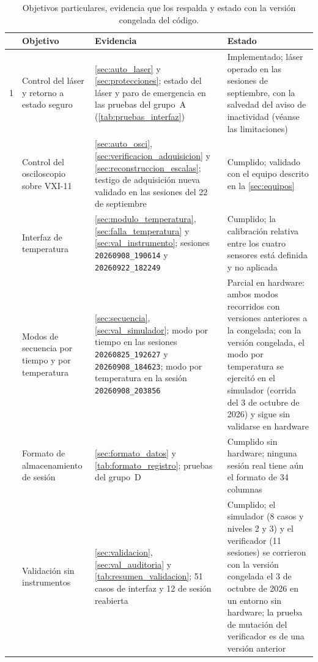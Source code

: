 \begin{table}[H]
  \centering
  \caption{Objetivos particulares, evidencia que los respalda y estado
           con la versión congelada del código.}
  \label{tab:objetivos_evidencia}
  \footnotesize
  \begin{tabular}{p{0.5cm}>{\raggedright\arraybackslash}p{3.3cm}>{\raggedright\arraybackslash}p{4.8cm}>{\raggedright\arraybackslash}p{4.6cm}}
    \toprule
    & \textbf{Objetivo} & \textbf{Evidencia} & \textbf{Estado} \\
    \midrule
    1 & Control del láser y retorno a estado seguro &
    \cref{sec:auto_laser} y \cref{sec:protecciones}; estado del
    láser y paro de emergencia en las pruebas del grupo~A
    (\cref{tab:pruebas_interfaz}) &
    Implementado; láser operado en las sesiones de septiembre, con la
    salvedad del aviso de inactividad (véanse las limitaciones) \\
    \addlinespace[2pt]
    2 & Control del osciloscopio sobre VXI-11 &
    \cref{sec:auto_osci}, \cref{sec:verificacion_adquisicion} y
    \cref{sec:reconstruccion_escalas}; testigo de adquisición nueva
    validado en las sesiones del 22 de septiembre &
    Cumplido; validado con el equipo descrito en la
    \cref{sec:equipos} \\
    \addlinespace[2pt]
    3 & Interfaz de temperatura &
    \cref{sec:modulo_temperatura}, \cref{sec:falla_temperatura} y
    \cref{sec:val_instrumento}; sesiones \texttt{20260908\_190614} y
    \texttt{20260922\_182249} &
    Cumplido; la calibración relativa entre los cuatro sensores
    está definida y no aplicada \\
    \addlinespace[2pt]
    4 & Modos de secuencia por tiempo y por temperatura &
    \cref{sec:secuencia}, \cref{sec:val_simulador}; modo por tiempo en
    las sesiones \texttt{20260825\_192627} y
    \texttt{20260908\_184623}; modo por temperatura en la sesión
    \texttt{20260908\_203856} &
    Parcial en hardware: ambos modos recorridos con versiones
    anteriores a la congelada; con la versión congelada, el modo por
    temperatura se ejercitó en el simulador (corrida del 3 de octubre de
    2026) y sigue sin validarse en hardware \\
    \addlinespace[2pt]
    5 & Formato de almacenamiento de sesión &
    \cref{sec:formato_datos} y \cref{tab:formato_registro};
    pruebas del grupo~D &
    Cumplido sin hardware; ninguna sesión real tiene aún el formato
    de 34 columnas \\
    \addlinespace[2pt]
    6 & Validación sin instrumentos &
    \cref{sec:validacion}, \cref{sec:val_auditoria} y
    \cref{tab:resumen_validacion}; 51 casos de interfaz y 12 de sesión
    reabierta &
    Cumplido; el simulador (8 casos y niveles 2 y 3) y el verificador
    (11 sesiones) se corrieron con la versión congelada el 3 de octubre
    de 2026 en un entorno sin hardware; la prueba de mutación del
    verificador es de una versión anterior \\
    \bottomrule
  \end{tabular}
\end{table}

